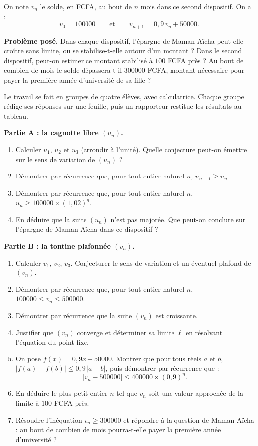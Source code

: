 \documentclass[11pt]{article}
\newcounter{popsec}
\newcounter{popsub}
\newcommand{\courssub}[1]{%
  \stepcounter{popsub}%
  \par\vspace{9pt}\noindent{\popxbold\fontsize{11.5}{13}\selectfont\color{popink}{\color{poporange}\thepopsec.\thepopsub}\hspace{6pt}#1}\par\nopagebreak\vspace{4pt}
}
\begin{document}
On note $v_n$ le solde, en FCFA, au bout de $n$ mois dans ce second dispositif. On a :
\[ v_0 = \num{100000} \qquad \text{et} \qquad v_{n+1} = 0{,}9\,v_n + \num{50000}. \]

\textbf{Problème posé.} Dans chaque dispositif, l'épargne de Maman Aïcha peut-elle croître sans limite, ou se stabilise-t-elle autour d'un montant ? Dans le second dispositif, peut-on estimer ce montant stabilisé à $100$ FCFA près ? Au bout de combien de mois le solde dépassera-t-il \num{300000} FCFA, montant nécessaire pour payer la première année d'université de sa fille ?

\courssub{Consignes}

Le travail se fait en groupes de quatre élèves, avec calculatrice. Chaque groupe rédige ses réponses sur une feuille, puis un rapporteur restitue les résultats au tableau.

\textbf{Partie A : la cagnotte libre $(u_n)$.}

\begin{enumerate}
\item Calculer $u_1$, $u_2$ et $u_3$ (arrondir à l'unité). Quelle conjecture peut-on émettre sur le sens de variation de $(u_n)$ ?
\item Démontrer par récurrence que, pour tout entier naturel $n$, $u_{n+1} \geq u_n$.
\item Démontrer par récurrence que, pour tout entier naturel $n$, $u_n \geq \num{100000}\times (1{,}02)^n$.
\item En déduire que la suite $(u_n)$ n'est pas majorée. Que peut-on conclure sur l'épargne de Maman Aïcha dans ce dispositif ?
\end{enumerate}

\textbf{Partie B : la tontine plafonnée $(v_n)$.}

\begin{enumerate}
\item Calculer $v_1$, $v_2$, $v_3$. Conjecturer le sens de variation et un éventuel plafond de $(v_n)$.
\item Démontrer par récurrence que, pour tout entier naturel $n$, $\num{100000} \leq v_n \leq \num{500000}$.
\item Démontrer par récurrence que la suite $(v_n)$ est croissante.
\item Justifier que $(v_n)$ converge et déterminer sa limite $\ell$ en résolvant l'équation du point fixe.
\item On pose $f(x)=0{,}9x+\num{50000}$. Montrer que pour tous réels $a$ et $b$, $|f(a)-f(b)| \leq 0{,}9\,|a-b|$, puis démontrer par récurrence que :
\[ |v_n - \num{500000}| \leq \num{400000}\times (0{,}9)^n. \]
\item En déduire le plus petit entier $n$ tel que $v_n$ soit une valeur approchée de la limite à $100$ FCFA près.
\item Résoudre l'inéquation $v_n \geq \num{300000}$ et répondre à la question de Maman Aïcha : au bout de combien de mois pourra-t-elle payer la première année d'université ?
\end{enumerate}
\end{document}
